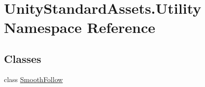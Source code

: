\hypertarget{namespace_unity_standard_assets_1_1_utility}{}\section{Unity\+Standard\+Assets.\+Utility Namespace Reference}
\label{namespace_unity_standard_assets_1_1_utility}
\subsection*{Classes}
\begin{DoxyCompactItemize}
\item 
class \hyperlink{class_unity_standard_assets_1_1_utility_1_1_smooth_follow}{Smooth\+Follow}
\end{DoxyCompactItemize}
